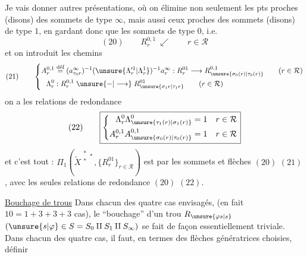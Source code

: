 
Je vais donner   autres présentations, où on élimine non seulement les pts proches (disons) des  sommets de type $\infty$,  mais aussi ceux proches des sommets (disons) de type $1$, en gardant donc que les sommets  de type $0$, i.e.
\[
(20)\qquad R_r^{0,1}\ \swarrow\qquad r\in\mathcal{R}
\]
et on introduit les chemins
\[
(21)\qquad\left\{\begin{aligned}
A_r^{0,1}&\overset{\text{déf}}{=}(a_{\tau_0r}^\infty)^{-1}(\unsure{\Lambda_r^{\prime1}|\Lambda_r^1})^{-1}a_r^\infty:R_r^{01}\longrightarrow R_{\unsure{\sigma_0(r)|\tau_0(r)}}^{0,1}\qquad(r\in\mathcal{R})\\
\Lambda_r^0&:R_r^{0,1}\mathrel{\unsure{-|\longrightarrow}} R_{\unsure{\sigma_1r|\tau_1r}}^{01}\qquad(r\in\mathcal{R})
\end{aligned}\right.
\]
on a les relations de redondance
\[
(22)\qquad\boxed{\left\{\begin{aligned}
\Lambda_r^0\Lambda_{\unsure{\tau_1(r)|\sigma_1(r)}}^0&=1&&r\in\mathcal{R}\\
A_r^{0,1}A_{\unsure{\sigma_0(r)|\tau_0(r)}}^{0,1}&=1&&r\in\mathcal{R}
\end{aligned}\right.}
\]
et c'est tout : $\Pi_1(\widetilde{X}^{\substack{*\\*}*},\{R_r^{01}\}_{r\in\mathcal{R}})$ est   par les sommets et flèches $(20)$ $(21)$, avec les seules relations de redondance $(20)$ $(22)$.

\uline{Bouchage de trous} Dans chacun des quatre cas envisagés, (en fait $10=1+3+3+3$ cas), le ``bouchage'' d'un trou $R_{\unsure{\varphi s|s}}$ $(\unsure{s|\varphi}\in S=S_0\amalg S_1\amalg S_\infty)$ se fait de façon essentiellement triviale. Dans chacun des quatre cas, il faut, en termes des flèches génératrices choisies, définir 

